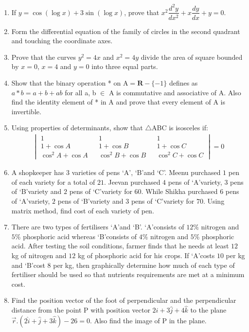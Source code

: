 \documentclass[12pt,-letter paper]{article}
\providecommand{\brak}[1]{\ensuremath{\left(#1\right)}}
\theoremstyle{remark}
\newcommand{\mydet}[1]{\ensuremath{\begin{vmatrix}#1\end{vmatrix}}}
\begin{document}
\begin{enumerate}
    \item If $y=\cos(\log x)+3\sin(\log x)$, prove that ${x}^2\dfrac{d^2y}{dx^2} + x\dfrac{dy}{dx}+{y}=0$.
    \item Form the differential equation of the family of circles in the second quadrant and touching the coordinate axes.
    
    \item Prove that the curves $y^2=4x$ and $x^2=4y$ divide the area of square bounded by $x=0$, $x=4$ and $y=0$ into three equal parts.
    \item Show that the binary operation * on $\mathrm{A} = \textbf{R} - \{-1\}$ defines as $a*b = a+b+ab$ for all a, b $\in$ A is commutative and associative of A. Also find the identity element of * in A and prove that every element of A is invertible.
    \item Using properties of determinants, show that $\triangle$ABC is isosceles if:
    \begin{align*}
         \mydet{1 && 1 && 1 \\ 1+\cos A && 1+\cos B && 1+\cos C \\ \cos^2A+\cos A && \cos^2B + \cos B && \cos^2C + \cos C}=0
    \end{align*}
    \item A shopkeeper has $3$ varieties of pens \lq A\rq, \lq B\rq and \lq C\rq. Meenu purchased $1$ pen of each variety for a total of \rupee $21$. Jeevan purchased $4$ pens of \lq A\rq variety, $3$ pens of \lq B\rq variety and $2$ pens of \lq C\rq variety for \rupee $60$. While Shikha purchased $6$ pens of \lq A\rq variety, $2$ pens of \lq B\rq variety and $3$ pens of \lq C\rq variety for \rupee $70$. Using matrix method, find cost of each variety of pen.
    \item There are two types of fertilisers \lq A\rq and \lq B\rq. \lq A\rq consists of $12\%$ nitrogen and $5\%$ phosphoric acid whereas \lq B\rq consists of $4\%$ nitrogen and $5\%$ phosphoric acid. After testing the soil conditions, farmer finds that he needs at least $12$ kg of nitrogen and $12$ kg of phosphoric acid for his crops. If \lq A\rq costs \rupee $10$ per kg and \lq B\rq cost \rupee $8$ per kg, then graphically determine how much of each type of fertiliser should be used so that nutrients requirements are met at a minimum cost.
    
    \item Find the position vector of the foot of perpendicular and the perpendicular distance from the point P with position vector $2\hat{i}+3\hat{j}+4\hat{k}$ to the plane $\overrightarrow{r}.\brak{2\hat{i}+\hat{j}+3\hat{k}} - 26 = 0$. Also find the image of P in the plane.


\end{enumerate}
\end{document}
